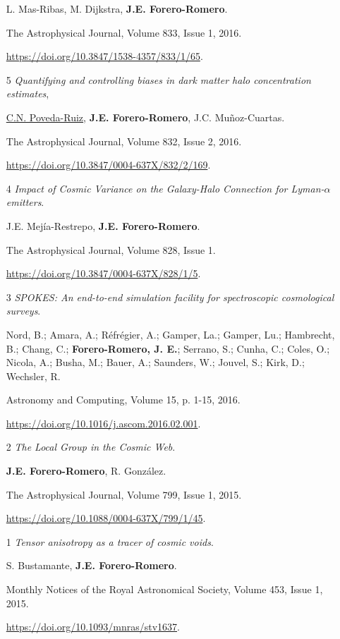 \documentclass{article}
\begin{document}
\begin{itemize}
L. Mas-Ribas, M. Dijkstra, {\bf J.E. Forero-Romero}.

The Astrophysical Journal, Volume 833, Issue 1, 2016. 

\url{https://doi.org/10.3847/1538-4357/833/1/65}. 


\item[5]{\it Quantifying and controlling biases in dark matter halo
  concentration estimates}, 

\underline{C.N. Poveda-Ruiz}, {\bf J.E. Forero-Romero}, J.C. Mu\~noz-Cuartas. 

The Astrophysical Journal, Volume 832, Issue 2, 2016. 

\url{https://doi.org/10.3847/0004-637X/832/2/169}.

\item[4]{\it Impact of Cosmic Variance on the Galaxy-Halo Connection
  for Lyman-$\alpha$ emitters}.  

J.E. Mej\'ia-Restrepo, {\bf J.E. Forero-Romero}.

The Astrophysical Journal, Volume 828, Issue 1.

\url{https://doi.org/10.3847/0004-637X/828/1/5}.

\item[3]{\it SPOKES: An end-to-end simulation facility for
  spectroscopic cosmological surveys}.
 
	Nord, B.; Amara, A.; R\'efr\'egier, A.; Gamper, La.; Gamper, Lu.;
        Hambrecht, B.; Chang, C.; {\bf Forero-Romero, J. E.}; Serrano, S.;
        Cunha, C.; Coles, O.; Nicola, A.; Busha, M.; Bauer, A.;
        Saunders, W.; Jouvel, S.; Kirk, D.; Wechsler, R.

Astronomy and Computing, Volume 15, p. 1-15, 2016.

\url{https://doi.org/10.1016/j.ascom.2016.02.001}.

\item[2]{\it The Local Group in the Cosmic Web}.

{\bf J.E. Forero-Romero}, R. González.

The Astrophysical Journal, Volume 799, Issue 1, 2015.

\url{https://doi.org/10.1088/0004-637X/799/1/45}.

\item[1] {\it Tensor anisotropy as a tracer of cosmic voids}. 

S. Bustamante, {\bf J.E. Forero-Romero}. 

Monthly Notices of the Royal Astronomical Society, Volume 453, Issue 1, 2015.

\url{https://doi.org/10.1093/mnras/stv1637}.

\end{itemize}
\end{document}
